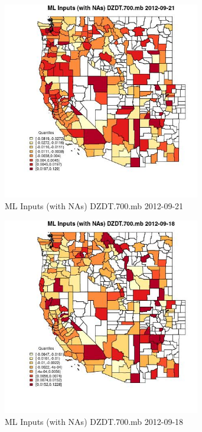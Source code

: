 \begin{figure} 
\centering  
\includegraphics[width=0.77\textwidth]{Code_Outputs/Report_ML_input_PM25_Step4_part_e_de_duplicated_aves_compiled_2019-05-14wNAs_CountyDZDT700mbMean2012-09-21_2012-09-21.jpg} 
\caption{\label{fig:Report_ML_input_PM25_Step4_part_e_de_duplicated_aves_compiled_2019-05-14wNAsCountyDZDT700mbMean2012-09-21_2012-09-21}ML Inputs (with NAs) DZDT.700.mb 2012-09-21} 
\end{figure} 
 

\begin{figure} 
\centering  
\includegraphics[width=0.77\textwidth]{Code_Outputs/Report_ML_input_PM25_Step4_part_e_de_duplicated_aves_compiled_2019-05-14wNAs_CountyDZDT700mbMean2012-09-18_2012-09-18.jpg} 
\caption{\label{fig:Report_ML_input_PM25_Step4_part_e_de_duplicated_aves_compiled_2019-05-14wNAsCountyDZDT700mbMean2012-09-18_2012-09-18}ML Inputs (with NAs) DZDT.700.mb 2012-09-18} 
\end{figure} 
 

